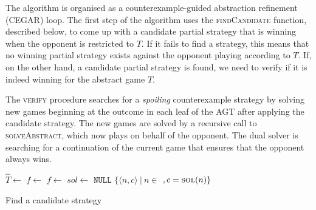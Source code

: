 The algorithm is organised as a counterexample-guided abstraction refinement (CEGAR) loop.  The first step of the algorithm uses the \textsc{findCandidate} function, described below, to come up with a candidate partial strategy that is winning when the opponent is restricted to $T$.  If it fails to find a strategy, this means that no winning partial strategy exists against the opponent playing according to $T$.  If, on the other hand, a candidate partial strategy is found, we need to verify if it is indeed winning for the abstract game $T$.

The \textsc{verify} procedure searches for a \emph{spoiling} counterexample strategy by solving new games beginning at the outcome in each leaf of the AGT after applying the candidate strategy. The new games are solved by a recursive call to \textsc{solveAbstract}, which now plays on behalf of the opponent. The dual solver is searching for a continuation of the current game that ensures that the opponent always wins.

\begin{algorithm}
    \begin{algorithmic}
        \State $\hat{T} \gets $  \label{line:extend}
                \State $f \gets $ 
            \Else
                \State $f \gets $ 
            \EndIf
            \State $sol \gets $ 
                \State \Return $\texttt{NULL}$ 
            \Else
                \State \Return $\{ \langle n, c \rangle\ |\ n \in $ $, c = \Call{sol}{n} \}$
            \EndIf
        \EndFunction
    \end{algorithmic}
    \caption{Find a candidate strategy}
    \label{alg:findcandidate}
\end{algorithm}


